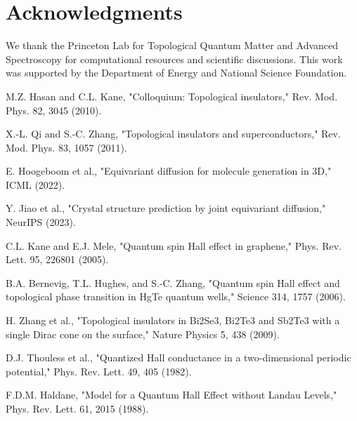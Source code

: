 \documentclass[12pt,a4paper]{article}
\begin{document}
\section*{Acknowledgments}

We thank the Princeton Lab for Topological Quantum Matter and Advanced Spectroscopy for computational resources and scientific discussions. This work was supported by the Department of Energy and National Science Foundation.


\begin{thebibliography}{99}

M.Z. Hasan and C.L. Kane, "Colloquium: Topological insulators," Rev. Mod. Phys. 82, 3045 (2010).

X.-L. Qi and S.-C. Zhang, "Topological insulators and superconductors," Rev. Mod. Phys. 83, 1057 (2011).

E. Hoogeboom et al., "Equivariant diffusion for molecule generation in 3D," ICML (2022).

Y. Jiao et al., "Crystal structure prediction by joint equivariant diffusion," NeurIPS (2023).

C.L. Kane and E.J. Mele, "Quantum spin Hall effect in graphene," Phys. Rev. Lett. 95, 226801 (2005).

B.A. Bernevig, T.L. Hughes, and S.-C. Zhang, "Quantum spin Hall effect and topological phase transition in HgTe quantum wells," Science 314, 1757 (2006).

H. Zhang et al., "Topological insulators in Bi2Se3, Bi2Te3 and Sb2Te3 with a single Dirac cone on the surface," Nature Physics 5, 438 (2009).

D.J. Thouless et al., "Quantized Hall conductance in a two-dimensional periodic potential," Phys. Rev. Lett. 49, 405 (1982).

F.D.M. Haldane, "Model for a Quantum Hall Effect without Landau Levels," Phys. Rev. Lett. 61, 2015 (1988).

\end{thebibliography}
\end{document}

